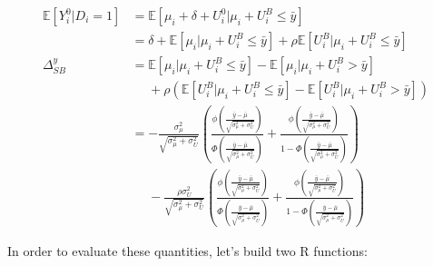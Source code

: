 \documentclass[
]{book}
\newcommand{\esp}[1]{\mathbb{E}[ #1 ]}
\theoremstyle{definition}
\theoremstyle{definition}
\theoremstyle{definition}
\theoremstyle{definition}
\theoremstyle{remark}
\begin{document}
\begin{align*}
\esp{Y_i^0|D_i=1} & = \esp{\mu_i+\delta+U_i^0|\mu_i+U_i^B\leq\bar{y}}\\
                  & = \delta + \esp{\mu_i|\mu_i+U_i^B\leq\bar{y}} + \rho\esp{U_i^B|\mu_i+U_i^B\leq\bar{y}}\\
\Delta^y_{SB}     & = \esp{\mu_i|\mu_i+U_i^B\leq\bar{y}}-\esp{\mu_i|\mu_i+U_i^B>\bar{y}} \\
                  & \phantom{=} + \rho\left(\esp{U_i^B|\mu_i+U_i^B\leq\bar{y}}-\esp{U_i^B|\mu_i+U_i^B>\bar{y}}\right)\\
                  & = -\frac{\sigma^2_{\mu}}{\sqrt{\sigma^2_{\mu}+\sigma^2_{U}}}\left(\frac{\phi\left(\frac{\bar{y}-\bar{\mu}}{\sqrt{\sigma^2_{\mu}+\sigma^2_{U}}}\right)}{\Phi\left(\frac{\bar{y}-\bar{\mu}}{\sqrt{\sigma^2_{\mu}+\sigma^2_{U}}}\right)}+\frac{\phi\left(\frac{\bar{y}-\bar{\mu}}{\sqrt{\sigma^2_{\mu}+\sigma^2_{U}}}\right)}{1-\Phi\left(\frac{\bar{y}-\bar{\mu}}{\sqrt{\sigma^2_{\mu}+\sigma^2_{U}}}\right)}\right) \\
                  & \phantom{=} -\frac{\rho\sigma^2_{U}}{\sqrt{\sigma^2_{\mu}+\sigma^2_{U}}}\left(\frac{\phi\left(\frac{\bar{y}-\bar{\mu}}{\sqrt{\sigma^2_{\mu}+\sigma^2_{U}}}\right)}{\Phi\left(\frac{\bar{y}-\bar{\mu}}{\sqrt{\sigma^2_{\mu}+\sigma^2_{U}}}\right)}+\frac{\phi\left(\frac{\bar{y}-\bar{\mu}}{\sqrt{\sigma^2_{\mu}+\sigma^2_{U}}}\right)}{1-\Phi\left(\frac{\bar{y}-\bar{\mu}}{\sqrt{\sigma^2_{\mu}+\sigma^2_{U}}}\right)}\right)
\end{align*}

In order to evaluate these quantities, let's build two R functions:
\end{document}
